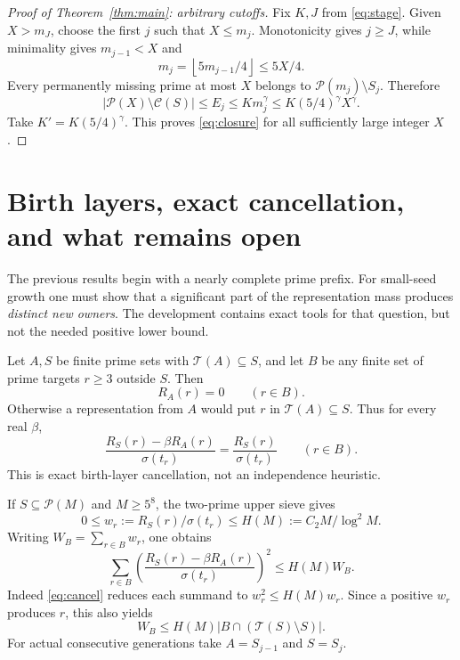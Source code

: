 \documentclass[11pt]{article}
\theoremstyle{definition}
\theoremstyle{remark}
\newcommand{\PP}{\mathcal P}
\newcommand{\Cl}{\mathcal C}
\newcommand{\cT}{\mathcal T}
\newcommand{\sig}{\sigma}
\newcommand{\card}[1]{\lvert #1\rvert}
\newcommand{\floor}[1]{\left\lfloor #1\right\rfloor}
\begin{document}
\begin{proof}[Proof of Theorem~\ref{thm:main}: arbitrary cutoffs]
Fix \(K,J\) from \eqref{eq:stage}. Given \(X>m_J\), choose the first
\(j\) such that \(X\le m_j\). Monotonicity gives \(j\ge J\), while
minimality gives \(m_{j-1}<X\) and
\[
 m_j=\floor{5m_{j-1}/4}\le5X/4.
\]
Every permanently missing prime at most \(X\) belongs to
\(\PP(m_j)\setminus S_j\). Therefore
\[
 \card{\PP(X)\setminus\Cl(S)}
 \le E_j\le Km_j^\gamma\le K(5/4)^\gamma X^\gamma.
\]
Take \(K'=K(5/4)^\gamma\). This proves \eqref{eq:closure}
for all sufficiently large integer \(X\).
\end{proof}

\section{Birth layers, exact cancellation, and what remains open}
\label{sec:birth}

The previous results begin with a nearly complete prime prefix.
For small-seed growth one must show that a significant part of the
representation mass produces \emph{distinct new owners}.
The development contains exact tools for that question, but not the
needed positive lower bound.

Let \(A,S\) be finite prime sets with \(\cT(A)\subseteq S\), and let
\(B\) be any finite set of prime targets \(r\ge3\) outside \(S\).
Then
\begin{equation}\label{eq:cancel}
 R_A(r)=0\qquad(r\in B).
\end{equation}
Otherwise a representation from \(A\) would put \(r\) in
\(\cT(A)\subseteq S\). Thus for every real \(\beta\),
\[
 \frac{R_S(r)-\beta R_A(r)}{\sig(t_r)}
   =\frac{R_S(r)}{\sig(t_r)}\qquad(r\in B).
\]
This is exact birth-layer cancellation, not an independence heuristic.

If \(S\subseteq\PP(M)\) and \(M\ge5^8\), the two-prime upper sieve gives
\[
 0\le w_r:=R_S(r)/\sig(t_r)\le
 H(M):=C_2M/\log^2M.
\]
Writing \(W_B=\sum_{r\in B}w_r\), one obtains
\begin{equation}\label{eq:energy}
 \sum_{r\in B}
 \left(\frac{R_S(r)-\beta R_A(r)}{\sig(t_r)}\right)^2
 \le H(M)W_B.
\end{equation}
Indeed \eqref{eq:cancel} reduces each summand to \(w_r^2\le H(M)w_r\).
Since a positive \(w_r\) produces \(r\), this also yields
\begin{equation}\label{eq:newcount}
 W_B\le H(M)\card{B\cap(\cT(S)\setminus S)}.
\end{equation}
For actual consecutive generations take \(A=S_{j-1}\) and \(S=S_j\).
\end{document}
